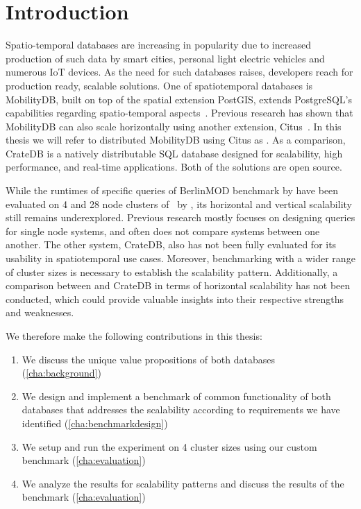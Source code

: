 \section{Introduction}
\label{cha:introduction}

Spatio-temporal databases are increasing in popularity due to increased production of such data by smart cities, personal light electric vehicles and numerous IoT devices.
As the need for such databases raises, developers reach for production ready, scalable solutions.
One of spatiotemporal databases is MobilityDB, built on top of the spatial extension PostGIS, extends PostgreSQL's capabilities regarding spatio-temporal aspects~\parencite{zimanyiMobilityDBMobilityDatabase2020}.
Previous research has shown that MobilityDB can also scale horizontally using another extension, Citus~\parencite{bakliDistributedMobilityData2020, bakliDistributedMovingObject2019, cubukcuCitusDistributedPostgreSQL2021}.
In this thesis we will refer to distributed MobilityDB using Citus as \mobilitydbc.
As a comparison, CrateDB is a natively distributable SQL database designed for scalability, high performance, and real-time applications.
Both of the solutions are open source.

While the runtimes of specific queries of BerlinMOD benchmark by \textcite{duntgenBerlinMODBenchmarkMoving2009} have been evaluated on 4 and 28 node clusters of \mobilitydbc~by \parencite{bakliDistributedMobilityData2020}, its horizontal and vertical scalability still remains underexplored.
Previous research mostly focuses on designing queries for single node systems, and often does not compare systems between one another. 
The other system, CrateDB, also has not been fully evaluated for its usability in spatiotemporal use cases.
Moreover, benchmarking with a wider range of cluster sizes is necessary to establish the scalability pattern.
Additionally, a comparison between \mobilitydbc and CrateDB in terms of horizontal scalability has not been conducted, which could provide valuable insights into their respective strengths and weaknesses.

We therefore make the following contributions in this thesis:
\begin{enumerate}
    \item We discuss the unique value propositions of both databases (\cref{cha:background})
    \item We design and implement a benchmark of common functionality of both databases that addresses the scalability according to requirements we have identified (\cref{cha:benchmarkdesign})
    \item We setup and run the experiment on 4 cluster sizes using our custom benchmark (\cref{cha:evaluation})
    \item We analyze the results for scalability patterns and discuss the results of the benchmark (\cref{cha:evaluation})
\end{enumerate}
